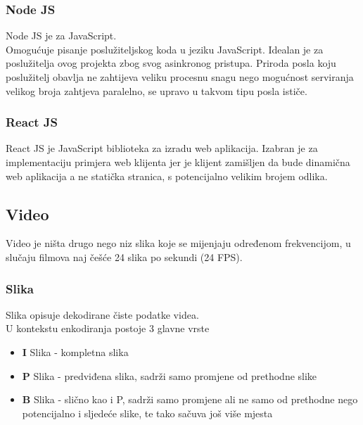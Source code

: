 \subsubsection{Node JS}
Node JS je  za JavaScript. \\
Omogućuje pisanje poslužiteljskog koda u jeziku JavaScript. \cite{nodeBook}
\paraBreak
Idealan je za poslužitelja ovog projekta zbog svog  asinkronog pristupa.
Priroda posla koju poslužitelj obavlja ne zahtijeva veliku procesnu snagu nego mogućnost serviranja velikog broja zahtjeva
paralelno,  se upravo u takvom tipu posla ističe. \cite{nodeBook}

\subsubsection{React JS}
React JS je  JavaScript biblioteka za izradu web aplikacija.
\paraBreak
Izabran je za implementaciju primjera web klijenta jer je klijent zamišljen da bude dinamična web aplikacija a ne statička
stranica, s potencijalno velikim brojem odlika. \cite{reactBook}
\paraBreak

\clearpage
\subsection{Video} \label{sec:video}
Video je ništa drugo nego niz slika koje se mijenjaju određenom frekvencijom, u slučaju filmova naj češće 24 slika 
po sekundi (24 FPS). \cite{ffmpegBook}

\subsubsection{Slika} \label{sec:slika}
Slika opisuje dekodirane čiste podatke videa. \\
U kontekstu enkodiranja postoje 3 glavne vrste \begin{itemize}
  \item \textbf{I} Slika - kompletna slika
  \item \textbf{P} Slika - predviđena slika, sadrži samo promjene od prethodne slike
  \item \textbf{B} Slika - slično kao i P, sadrži samo promjene ali ne samo od prethodne nego potencijalno i sljedeće 
  slike, te tako sačuva još više mjesta
\end{itemize}

